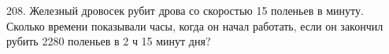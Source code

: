 208. Железный дровосек рубит дрова со скоростью 15 поленьев в минуту. Сколько времени показывали часы, когда он начал работать, если он закончил рубить 2280 поленьев в 2 ч 15 минут дня?\\

